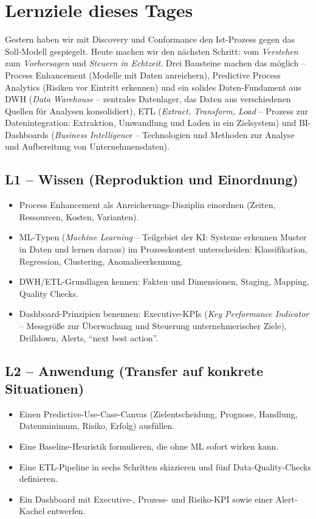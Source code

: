 \documentclass[11pt,a4paper,oneside]{article}
\begin{document}
\section*{Lernziele dieses Tages}
\thispagestyle{plain}

\noindent Gestern haben wir mit Discovery und Conformance den Ist-Prozess gegen das Soll-Modell gespiegelt. Heute machen wir den nächsten Schritt: vom \emph{Verstehen} zum \emph{Vorhersagen} und \emph{Steuern in Echtzeit}. Drei Bausteine machen das möglich -- Process Enhancement (Modelle mit Daten anreichern), Predictive Process Analytics (Risiken vor Eintritt erkennen) und ein solides Daten-Fundament aus DWH (\emph{Data Warehouse} -- zentrales Datenlager, das Daten aus verschiedenen Quellen für Analysen konsolidiert), ETL (\emph{Extract, Transform, Load} -- Prozess zur Datenintegration: Extraktion, Umwandlung und Laden in ein Zielsystem) und BI-Dashboards (\emph{Business Intelligence} -- Technologien und Methoden zur Analyse und Aufbereitung von Unternehmensdaten).

\subsection*{L1 -- Wissen (Reproduktion und Einordnung)}
\begin{itemize}
  \item Process Enhancement als Anreicherungs-Disziplin einordnen (Zeiten, Ressourcen, Kosten, Varianten).
  \item ML-Typen (\emph{Machine Learning} -- Teilgebiet der KI: Systeme erkennen Muster in Daten und lernen daraus) im Prozesskontext unterscheiden: Klassifikation, Regression, Clustering, Anomalieerkennung.
  \item DWH/ETL-Grundlagen kennen: Fakten und Dimensionen, Staging, Mapping, Quality Checks.
  \item Dashboard-Prinzipien benennen: Executive-KPIs (\emph{Key Performance Indicator} -- Messgröße zur Überwachung und Steuerung unternehmerischer Ziele), Drilldown, Alerts, ``next best action''.
\end{itemize}

\subsection*{L2 -- Anwendung (Transfer auf konkrete Situationen)}
\begin{itemize}
  \item Einen Predictive-Use-Case-Canvas (Zielentscheidung, Prognose, Handlung, Datenminimum, Risiko, Erfolg) ausfüllen.
  \item Eine Baseline-Heuristik formulieren, die ohne ML sofort wirken kann.
  \item Eine ETL-Pipeline in sechs Schritten skizzieren und fünf Data-Quality-Checks definieren.
  \item Ein Dashboard mit Executive-, Prozess- und Risiko-KPI sowie einer Alert-Kachel entwerfen.
\end{itemize}
\end{document}

